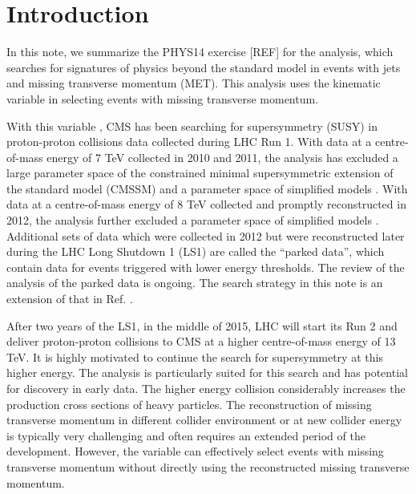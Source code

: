 \section{Introduction}
\label{sec:intro}


In this note, we summarize the PHYS14 exercise [REF] for the \alphat
analysis, which searches for signatures of physics beyond the standard
model in events with jets and missing transverse momentum (MET). This
analysis uses the kinematic variable \alphat in selecting events with
missing transverse momentum.

With this variable \alphat, CMS has been searching for supersymmetry
(SUSY) in proton-proton collisions data collected during LHC Run 1. With
data at a centre-of-mass energy of 7 TeV collected in 2010 and 2011, the
\alphat analysis has excluded a large parameter space of the constrained
minimal supersymmetric extension of the standard model (CMSSM)
\cite{Khachatryan:2011tk, Chatrchyan:2011zy, Chatrchyan:2012wa} and a
parameter space of simplified models \cite{Chatrchyan:2012wa}. With data
at a centre-of-mass energy of 8 TeV collected and promptly reconstructed
in 2012, the \alphat analysis further excluded a parameter space of
simplified models \cite{Chatrchyan:2013lya}. Additional sets of data
which were collected in 2012 but were reconstructed later during the LHC
Long Shutdown 1 (LS1) are called the ``parked data'', which contain data
for events triggered with lower energy thresholds. The review of the
\alphat analysis of the parked data \cite{CMS_AN_2013-366} is ongoing.
The search strategy in this note is an extension of that in Ref.
\cite{CMS_AN_2013-366}.

After two years of the LS1, in the middle of 2015, LHC will start its
Run 2 and deliver proton-proton collisions to CMS at a higher
centre-of-mass energy of 13 TeV. It is highly motivated to continue the
search for supersymmetry at this higher energy. The \alphat analysis is
particularly suited for this search and has potential for discovery in
early data. The higher energy collision considerably increases the
production cross sections of heavy particles. The reconstruction of
missing transverse momentum in different collider environment or at new
collider energy is typically very challenging and often requires an
extended period of the development. However, the variable \alphat can
effectively select events with missing transverse momentum without
directly using the reconstructed missing transverse momentum.

